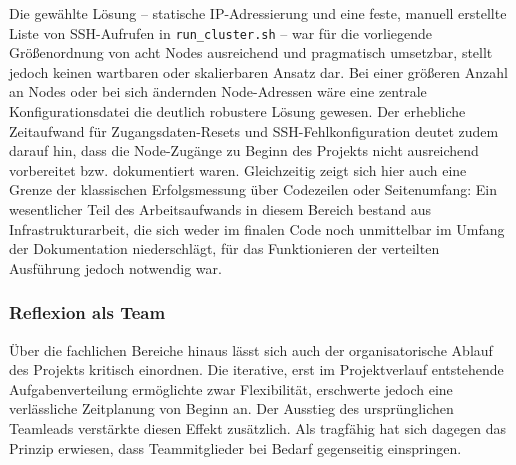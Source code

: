 Die gewählte Lösung -- statische IP-Adressierung und eine feste,
manuell erstellte Liste von SSH-Aufrufen in \texttt{run\_cluster.sh} --
war für die vorliegende Größenordnung von acht Nodes ausreichend und
pragmatisch umsetzbar, stellt jedoch keinen wartbaren oder skalierbaren
Ansatz dar. Bei einer größeren Anzahl an Nodes oder bei sich ändernden
Node-Adressen wäre eine zentrale Konfigurationsdatei die deutlich
robustere Lösung gewesen. Der erhebliche Zeitaufwand für
Zugangsdaten-Resets und SSH-Fehlkonfiguration deutet zudem darauf hin,
dass die Node-Zugänge zu Beginn des Projekts nicht ausreichend
vorbereitet bzw. dokumentiert waren. Gleichzeitig zeigt sich hier auch
eine Grenze der klassischen Erfolgsmessung über Codezeilen oder
Seitenumfang: Ein wesentlicher Teil des Arbeitsaufwands in diesem Bereich
bestand aus Infrastrukturarbeit, die sich weder im finalen Code noch
unmittelbar im Umfang der Dokumentation niederschlägt, für das
Funktionieren der verteilten Ausführung jedoch notwendig war.

\subsubsection{Reflexion als Team}
\label{sec:reflexion-team}

Über die fachlichen Bereiche hinaus lässt sich auch der organisatorische
Ablauf des Projekts kritisch einordnen. Die iterative, erst im
Projektverlauf entstehende Aufgabenverteilung ermöglichte zwar
Flexibilität, erschwerte jedoch eine verlässliche Zeitplanung von Beginn
an. Der Ausstieg des ursprünglichen Teamleads verstärkte diesen Effekt
zusätzlich. Als tragfähig hat sich dagegen das Prinzip erwiesen, dass
Teammitglieder bei Bedarf gegenseitig einspringen.

